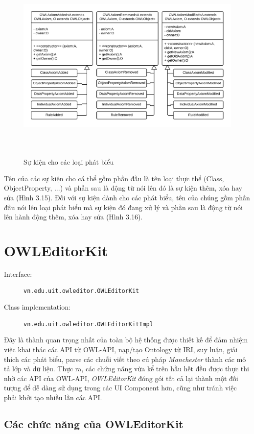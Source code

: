 {\begin{figure}[h!]
	\includegraphics[height=97mm]{Figures/uml_axiom_event.png}
	\caption{Sự kiện cho các loại phát biểu \label{overflow}}
\end{figure}
Tên của các sự kiện cho cá thể gồm phần đầu là tên loại thực thể (Class, ObjectProperty, ...) và phần sau là động từ nói lên đó là sự kiện thêm, xóa hay sửa (Hình 3.15). Đối với sự kiện dành cho các phát biểu, tên của chúng gồm phần đầu nói lên loại phát biểu mà sự kiện đó đang xử lý và phần sau là động từ nói lên hành động thêm, xóa hay sửa (Hình 3.16).
\\
\section{OWLEditorKit}
\begin{description}
	\item[Interface:] \verb|vn.edu.uit.owleditor.OWLEditorKit|
	\item[Class implementation:] \verb|vn.edu.uit.owleditor.OWLEditorKitImpl|
\end{description}
Đây là thành quan trọng nhất của toàn bộ hệ thống được thiết kế để đảm nhiệm việc khai thác các API từ OWL-API, nạp/tạo Ontology từ IRI, suy luận, giải thích các phát biểu, parse các chuỗi viết theo cú pháp \textit{Manchester} thành các mô tả lớp và dữ liệu. Thực ra, các chứng năng vừa kể trên hầu hết đều được thực thi nhờ các API của OWL-API, \textit{OWLEditorKit} đóng gói tất cả lại thành một đối tượng để dễ dàng sử dụng trong các UI Component hơn, cũng như tránh việc phải khởi tạo nhiều lần các API. 
\subsection{Các chức năng của OWLEditorKit}

}
